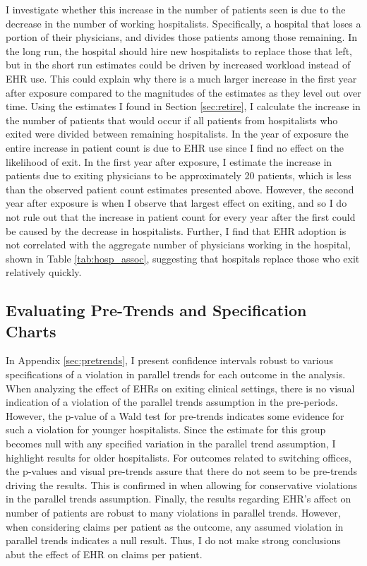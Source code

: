 \documentclass[12pt]{article}
\begin{document}
I investigate whether this increase in the number of patients seen is due to the decrease in the number of working hospitalists. Specifically, a hospital that loses a portion of their physicians, and divides those patients among those remaining. In the long run, the hospital should hire new hospitalists to replace those that left, but in the short run estimates could be driven by increased workload instead of EHR use. This could explain why there is a much larger increase in the first year after exposure compared to the magnitudes of the estimates as they level out over time. Using the estimates I found in Section \ref{sec:retire}, I calculate the increase in the number of patients that would occur if all patients from hospitalists who exited were divided between remaining hospitalists. In the year of exposure the entire increase in patient count is due to EHR use since I find no effect on the likelihood of exit. In the first year after exposure, I estimate the increase in patients due to exiting physicians to be approximately 20 patients, which is less than the observed patient count estimates presented above. However, the second year after exposure is when I observe that largest effect on exiting, and so I do not rule out that the increase in patient count for every year after the first could be caused by the decrease in hospitalists. Further, I find that EHR adoption is not correlated with the aggregate number of physicians working in the hospital, shown in Table \ref{tab:hosp_assoc}, suggesting that hospitals replace those who exit relatively quickly.


\subsection{Evaluating Pre-Trends and Specification Charts}

In Appendix \ref{sec:pretrends}, I present confidence intervals robust to various specifications of a violation in parallel trends for each outcome in the analysis. When analyzing the effect of EHRs on exiting clinical settings, there is no visual indication of a violation of the parallel trends assumption in the pre-periods. However, the p-value of a Wald test for pre-trends indicates some evidence for such a violation for younger hospitalists. Since the estimate for this group becomes null with any specified variation in the parallel trend assumption, I highlight results for older hospitalists. For outcomes related to switching offices, the p-values and visual pre-trends assure that there do not seem to be pre-trends driving the results. This is confirmed in when allowing for conservative violations in the parallel trends assumption. Finally, the results regarding EHR's affect on number of patients are robust to many violations in parallel trends. However, when considering claims per patient as the outcome, any assumed violation in parallel trends indicates a null result. Thus, I do not make strong conclusions abut the effect of EHR on claims per patient. 
\end{document}
